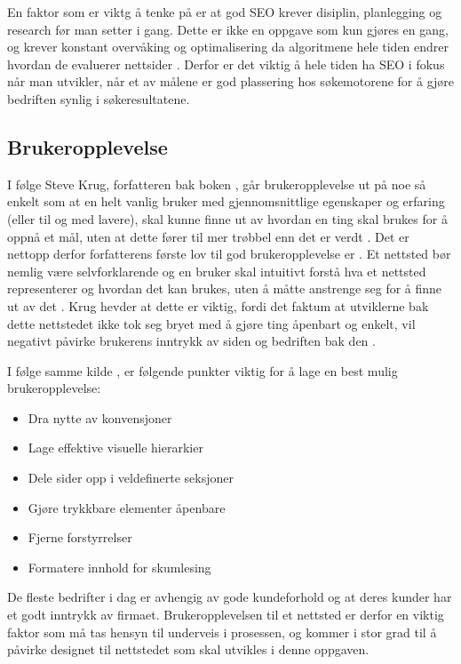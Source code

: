 En faktor som er viktg å tenke på er at god SEO krever disiplin, planlegging og research før man setter i gang. Dette er ikke en oppgave som kun gjøres en gang, og krever konstant overvåking og optimalisering da algoritmene hele tiden endrer hvordan de evaluerer nettsider \cite[s.~1]{mitchell2012usb}. Derfor er det viktig å hele tiden ha SEO i fokus når man utvikler, når et av målene er god plassering hos søkemotorene for å gjøre bedriften synlig i søkeresultatene.


\subsection{Brukeropplevelse}
\label{sec:ux}
I følge Steve Krug, forfatteren bak boken , går brukeropplevelse ut på noe så enkelt som at en helt vanlig bruker med gjennomsnittlige egenskaper og erfaring (eller til og med lavere), skal kunne finne ut av hvordan en ting skal brukes for å oppnå et mål, uten at dette fører til mer trøbbel enn det er verdt \cite[s.~9]{krug2014dmt}.
Det er nettopp derfor forfatterens første lov til god brukeropplevelse er . Et nettsted bør nemlig være selvforklarende og en bruker skal intuitivt forstå hva et nettsted representerer og hvordan det kan brukes, uten å måtte anstrenge seg for å finne ut av det \cite[s.~11]{krug2014dmt}.
Krug hevder at dette er viktig, fordi det faktum at utviklerne bak dette nettstedet ikke tok seg bryet med å gjøre ting åpenbart og enkelt, vil negativt påvirke brukerens inntrykk av siden og bedriften bak den \cite[s.~15]{krug2014dmt}.

I følge samme kilde \cite[s.~29]{krug2014dmt}, er følgende punkter viktig for å lage en best mulig brukeropplevelse:
\begin{itemize}
    \item Dra nytte av konvensjoner
    \item Lage effektive visuelle hierarkier
    \item Dele sider opp i veldefinerte seksjoner
    \item Gjøre trykkbare elementer åpenbare
    \item Fjerne forstyrrelser
    \item Formatere innhold for skumlesing
\end{itemize}

De fleste bedrifter i dag er avhengig av gode kundeforhold og at deres kunder har et godt inntrykk av firmaet. Brukeropplevelsen til et nettsted er derfor en viktig faktor som må tas hensyn til underveis i prosessen, og kommer i stor grad til å påvirke designet til nettstedet som skal utvikles i denne oppgaven.


